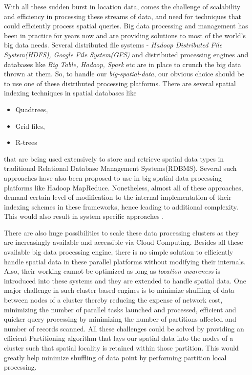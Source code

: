 \documentclass[article,type=msc,colorback,12pt,accentcolor=tud1d]{tudthesis}
\begin{document}
		With all these sudden burst in location data, comes the challenge of scalability and efficiency in processing these streams of data, and need for techniques that could efficiently process spatial queries.  Big data processing and management has been in practice for years now and are providing solutions to most of the world's big data needs. Several distributed file systems -\textit{ Hadoop Distributed File System(HDFS), Google File System(GFS)} and distributed processing engines and databases like \textit{Big Table, Hadoop, Spark} etc are in place to crunch the big data thrown at them. So, to handle our \textit{big-spatial-data}, our obvious choice should be to use one of these distributed processing platforms.  There are several spatial indexing techniques in spatial databases like \begin{itemize}
			\item Quadtrees, 
			\item Grid files, 
			\item R-trees
		\end{itemize}that are being used extensively to store and retrieve spatial data types in traditional Relational Database Management Systems(RDBMS). Several such approaches have also been proposed to use in big spatial data processing platforms like Hadoop MapReduce. Nonetheless, almost all of these approaches, demand certain level of modification to the internal implementation of their indexing schemes in these frameworks, hence leading to additional complexity. This would also result in  system specific approaches \cite{Lee:2014:ESQ:2666310.2666481} \cite{6691586}. 
		
		\clearpage
		There are also huge possibilities to scale these data processing clusters as they are increasingly available and accessible via Cloud Computing. Besides all these available big data processing engine, there is no simple solution to efficiently handle spatial data in these parallel platforms without modifying their internals. Also, their working cannot be optimized as long as \textit{location awareness} is introduced into these systems and they are extended to handle spatial data. One major challenge in such cluster based engines is to minimize shuffling of data between nodes of a cluster thereby reducing the expense of network cost, minimizing the number of parallel tasks launched and processed, efficient and quicker query processing by  minimizing the number of partitions affected and number of records scanned. All these challenges could be solved by providing an efficient Partitioning algorithm that lays our spatial data into the nodes of a cluster such that spatial locality is retained within those partition. This would greatly help minimize shuffling of data point by performing partition local processing. 
		
\end{document}
